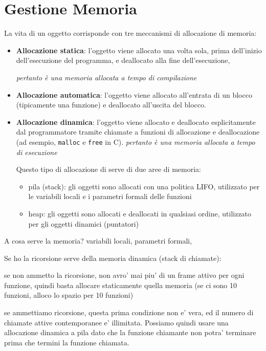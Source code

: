 % 

\chapter{Gestione Memoria}
La vita di un oggetto corrisponde con tre meccanismi di allocazione di memoria:
\begin{itemize}
\item \textbf{Allocazione statica}: l'oggetto viene allocato una volta sola, prima dell'inizio dell'esecuzione del programma, e deallocato alla fine dell'esecuzione, 

\textit{pertanto è una memoria allocata a tempo di compilazione}
\item \textbf{Allocazione automatica}: l'oggetto viene allocato all'entrata di un blocco (tipicamente una funzione) e deallocato all'uscita del blocco.


\item \textbf{Allocazione dinamica}: l'oggetto viene allocato e deallocato esplicitamente dal programmatore tramite chiamate a funzioni di allocazione e deallocazione (ad esempio, \texttt{malloc} e \texttt{free} in C).
\textit{pertanto è una memoria allocata a tempo di esecuzione}

Questo tipo di allocazione di serve di due aree di memoria:
\begin{itemize}
  \item pila (stack): gli oggetti sono allocati con una politica LIFO, utilizzato per le variabili locali e i parametri formali delle funzioni
  \item heap: gli oggetti sono allocati e deallocati in qualsiasi ordine, utilizzato per gli oggetti dinamici (puntatori)
  \end{itemize}
\end{itemize}


A cosa serve la memoria? variabili locali, parametri formali, 

Se ho la ricorsione serve della memoria dinamica (stack di chiamate):

se non ammetto la ricorsione, non avro' mai piu' di un frame attivo per ogni funzione, quindi basta allocare staticamente quella memoria (se ci sono 10 funzioni, alloco lo spazio per 10 funzioni)

se ammettiamo ricorsione, questa prima condizione non e' vera, ed il numero di chiamate attive contemporanee e' illimitata. Possiamo quindi usare una allocazione dinamica a pila dato che la funzione chiamante non potra' terminare prima che termini la funzione chiamata.

% 
